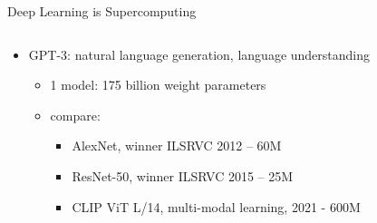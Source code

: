 \begin{frame}{Deep Learning is Supercomputing}
\protect\hypertarget{deep-learning-is-supercomputing-4}{}
\begin{columns}[T]
\begin{column}{0.4\textwidth}
\begin{itemize}
\tightlist
\item
  GPT-3: natural language generation, language understanding

  \begin{itemize}
  \tightlist
  \item
    1 model: 175 billion weight parameters
  \item
    compare:

    \begin{itemize}
    \tightlist
    \item
      AlexNet, winner ILSRVC 2012 -- 60M
    \item
      ResNet-50, winner ILSRVC 2015 -- 25M
    \item
      CLIP ViT L/14, multi-modal learning, 2021 - 600M
    \end{itemize}
  \end{itemize}
\end{itemize}
\end{column}

\begin{column}{0.6\textwidth}
\vspace*{2cm}
\end{column}
\end{columns}
\end{frame}


